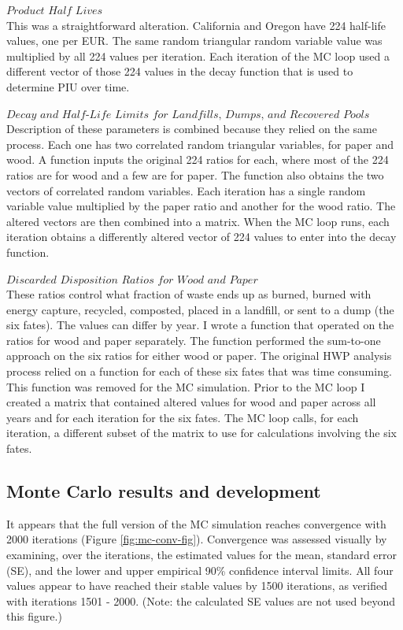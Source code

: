 \documentclass[
]{book}
\begin{document}
\(\textit{Product Half Lives}\)\\
This was a straightforward alteration. California and Oregon have 224 half-life values, one per EUR. The same random triangular random variable value was multiplied by all 224 values per iteration. Each iteration of the MC loop used a different vector of those 224 values in the decay function that is used to determine PIU over time.

\(\textit{Decay and Half-Life Limits for Landfills, Dumps, and Recovered Pools}\)\\
Description of these parameters is combined because they relied on the same process. Each one has two correlated random triangular variables, for paper and wood. A function inputs the original 224 ratios for each, where most of the 224 ratios are for wood and a few are for paper. The function also obtains the two vectors of correlated random variables. Each iteration has a single random variable value multiplied by the paper ratio and another for the wood ratio. The altered vectors are then combined into a matrix. When the MC loop runs, each iteration obtains a differently altered vector of 224 values to enter into the decay function.

\(\textit{Discarded Disposition Ratios for Wood and Paper}\)\\
These ratios control what fraction of waste ends up as burned, burned with energy capture, recycled, composted, placed in a landfill, or sent to a dump (the six fates). The values can differ by year. I wrote a function that operated on the ratios for wood and paper separately. The function performed the sum-to-one approach on the six ratios for either wood or paper. The original HWP analysis process relied on a function for each of these six fates that was time consuming. This function was removed for the MC simulation. Prior to the MC loop I created a matrix that contained altered values for wood and paper across all years and for each iteration for the six fates. The MC loop calls, for each iteration, a different subset of the matrix to use for calculations involving the six fates.

\hypertarget{model-mc-res}{%
\subsection{Monte Carlo results and development}\label{model-mc-res}}

It appears that the full version of the MC simulation reaches convergence with 2000 iterations (Figure \ref{fig:mc-conv-fig}). Convergence was assessed visually by examining, over the iterations, the estimated values for the mean, standard error (SE), and the lower and upper empirical 90\% confidence interval limits. All four values appear to have reached their stable values by 1500 iterations, as verified with iterations 1501 - 2000. (Note: the calculated SE values are not used beyond this figure.)
\end{document}
